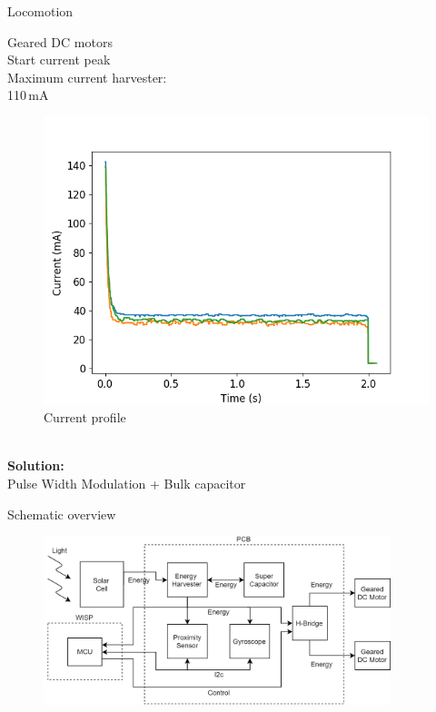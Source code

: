 \documentclass{beamer}
\begin{document}
\begin{frame}{Locomotion}
	\begin{minipage}{0.45\textwidth}
		Geared DC motors \\
		
		Start current peak \\
		
		Maximum current harvester: \\
		110\,mA
	\end{minipage}
	\begin{minipage}{0.54\textwidth}\raggedleft
		\begin{figure}
			\includegraphics[width=\textwidth]{pics/free_running_current.png}
			\caption*{Current profile}
		\end{figure}
	\end{minipage} \\
	\textbf{Solution:} \\
	Pulse Width Modulation + Bulk capacitor
\end{frame}

\begin{frame}{Schematic overview}
	\begin{figure}
		\centering
		\includegraphics[width=0.9\textwidth]{pics/schematic_robot_v2.png}
	\end{figure}
\end{frame}
\end{document}
